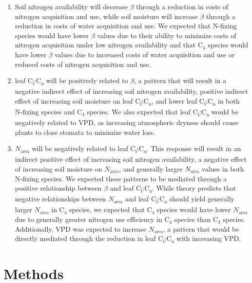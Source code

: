 \begin{enumerate}
    \item Soil nitrogen availability will decrease $\beta$ through a reduction in costs of nitrogen acquisition and use, while soil moisture will increase $\beta$ through a reduction in costs of water acquisition and use. We expected that N-fixing species would have lower $\beta$ values due to their ability to minimize costs of nitrogen acquisition under low nitrogen availability and that C$_4$ species would have lower $\beta$ values due to increased costs of water acquisition and use or reduced costs of nitrogen acquisition and use.
    
    \item leaf C\textsubscript{i}:C\textsubscript{a} will be positively related to $\beta$, a pattern that will result in a negative indirect effect of increasing soil nitrogen availability, positive indirect effect of increasing soil moisture on leaf C\textsubscript{i}:C\textsubscript{a}, and lower leaf C\textsubscript{i}:C\textsubscript{a} in both N-fixing species and C$_4$ species. We also expected that leaf C\textsubscript{i}:C\textsubscript{a} would be negatively related to VPD, as increasing atmospheric dryness should cause plants to close stomata to minimize water loss.

    \item $N_\mathrm{area}$ will be negatively related to leaf C\textsubscript{i}:C\textsubscript{a}. This response will result in an indirect positive effect of increasing soil nitrogen availability, a negative effect of increasing soil moisture on $N_\mathrm{area}$, and generally larger $N_\mathrm{area}$ values in both N-fixing species. We expected these patterns to be mediated through a positive relationship between $\beta$ and leaf C\textsubscript{i}:C\textsubscript{a}. While theory predicts that negative relationships between $N_\mathrm{area}$ and leaf C\textsubscript{i}:C\textsubscript{a} should yield generally larger $N_\mathrm{area}$ in C$_4$ species, we expected that C$_4$ species would have lower $N_\mathrm{area}$ due to generally greater nitrogen use efficiency in C$_4$ species than C$_3$ species. Additionally, VPD was expected to increase $N_\mathrm{area}$, a pattern that would be directly mediated through the reduction in leaf C\textsubscript{i}:C\textsubscript{a} with increasing VPD.
\end{enumerate}

\section{Methods}
